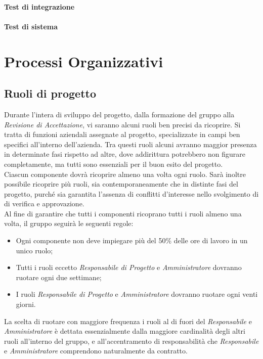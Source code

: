 \documentclass{scalatekids-article}
\begin{document}
\paragraph{Test di integrazione}

\paragraph{Test di sistema}


\section{Processi Organizzativi}


\subsection{Ruoli di progetto}

Durante l'intera  di sviluppo del progetto, dalla formazione del gruppo alla
\textit{Revisione di Accettazione}, vi saranno alcuni ruoli ben precisi da ricoprire. Si
tratta di funzioni aziendali assegnate al progetto, specializzate in campi ben
specifici all'interno dell'azienda. Tra questi ruoli alcuni avranno maggior
presenza in determinate fasi rispetto ad altre, dove addirittura
potrebbero non figurare completamente, ma tutti sono essenziali per il buon
esito del progetto.\\ Ciascun componente dovrà ricoprire almeno una volta ogni
ruolo. Sarà inoltre possibile ricoprire più ruoli, sia contemporaneamente che in
distinte fasi del progetto, purché sia garantita l'assenza di conflitti
d'interesse nello svolgimento di  di verifica e approvazione.\\
Al fine di garantire che tutti i componenti ricoprano tutti i ruoli almeno una volta, il gruppo seguirà le seguenti regole:
\begin{itemize}
    \item Ogni componente non deve impiegare più del 50\% delle ore di lavoro in un unico ruolo;
    \item Tutti i ruoli eccetto \textit{Responsabile di Progetto} e \textit{Amministratore} dovranno ruotare ogni due settimane;
    \item I ruoli \textit{Responsabile di Progetto} e \textit{Amministratore} dovranno ruotare ogni venti giorni.
\end{itemize}
La scelta di ruotare con maggiore frequenza i ruoli al di fuori del
\textit{Responsabile} e \textit{Amministratore} è dettata essenzialmente dalla
maggiore cardinalità degli altri ruoli all'interno del gruppo, e
all'accentramento di responsabilità che \textit{Responsabile} e
\textit{Amministratore} comprendono naturalmente da contratto.
\end{document}
